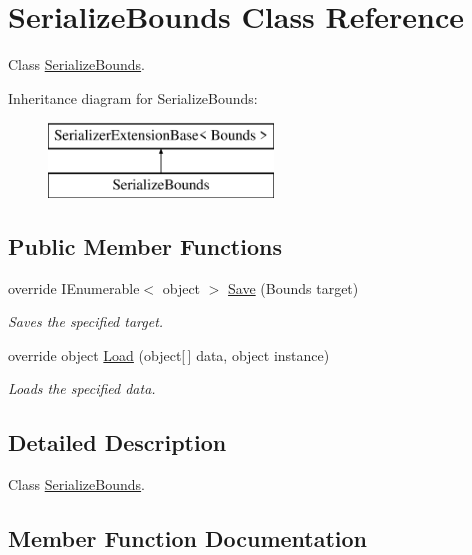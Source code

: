\hypertarget{class_serialize_bounds}{}\section{Serialize\+Bounds Class Reference}
\label{class_serialize_bounds}


Class \hyperlink{class_serialize_bounds}{Serialize\+Bounds}.  


Inheritance diagram for Serialize\+Bounds\+:\begin{figure}[H]
\begin{center}
\leavevmode
\includegraphics[height=2.000000cm]{class_serialize_bounds}
\end{center}
\end{figure}
\subsection*{Public Member Functions}
\begin{DoxyCompactItemize}
\item 
override I\+Enumerable$<$ object $>$ \hyperlink{class_serialize_bounds_a1bb554ee48efe17ae70c846ff86cbc13}{Save} (Bounds target)
\begin{DoxyCompactList}\small\item\em Saves the specified target. \end{DoxyCompactList}\item 
override object \hyperlink{class_serialize_bounds_acd4e2b5a17a744395609c58cbfacd9a2}{Load} (object\mbox{[}$\,$\mbox{]} data, object instance)
\begin{DoxyCompactList}\small\item\em Loads the specified data. \end{DoxyCompactList}\end{DoxyCompactItemize}


\subsection{Detailed Description}
Class \hyperlink{class_serialize_bounds}{Serialize\+Bounds}. 



\subsection{Member Function Documentation}
\mbox{\label{class_serialize_bounds_acd4e2b5a17a744395609c58cbfacd9a2}} 
